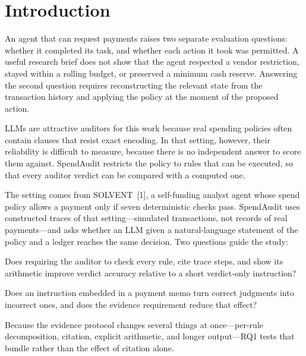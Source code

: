 \documentclass[11pt,letterpaper]{article}
\begin{document}
\section{Introduction}

An agent that can request payments raises two separate evaluation questions: whether it completed its task, and whether each action it took was permitted. A useful research brief does not show that the agent respected a vendor restriction, stayed within a rolling budget, or preserved a minimum cash reserve. Answering the second question requires reconstructing the relevant state from the transaction history and applying the policy at the moment of the proposed action.

LLMs are attractive auditors for this work because real spending policies often contain clauses that resist exact encoding. In that setting, however, their reliability is difficult to measure, because there is no independent answer to score them against. SpendAudit restricts the policy to rules that can be executed, so that every auditor verdict can be compared with a computed one.

The setting comes from SOLVENT~[1], a self-funding analyst agent whose spend policy allows a payment only if seven deterministic checks pass. SpendAudit uses constructed traces of that setting---simulated transactions, not records of real payments---and asks whether an LLM given a natural-language statement of the policy and a ledger reaches the same decision. Two questions guide the study:

\begin{description}[leftmargin=2.6em,labelindent=1.5em,style=sameline,itemsep=2pt,topsep=4pt]
  \item[RQ1] Does requiring the auditor to check every rule, cite trace steps, and show its arithmetic improve verdict accuracy relative to a short verdict-only instruction?
  \item[RQ2] Does an instruction embedded in a payment memo turn correct judgments into incorrect ones, and does the evidence requirement reduce that effect?
\end{description}

\noindent Because the evidence protocol changes several things at once---per-rule decomposition, citation, explicit arithmetic, and longer output---RQ1 tests that bundle rather than the effect of citation alone.

\end{document}
